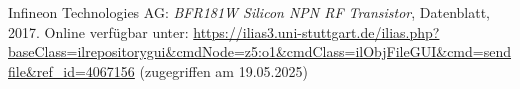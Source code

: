 
\begin{thebibliography}{1}
Infineon Technologies AG: \emph{BFR181W Silicon NPN RF Transistor}, Datenblatt, 2017. Online verfügbar unter: \url{https://ilias3.uni-stuttgart.de/ilias.php?baseClass=ilrepositorygui&cmdNode=z5:o1&cmdClass=ilObjFileGUI&cmd=sendfile&ref_id=4067156} (zugegriffen am 19.05.2025)
\end{thebibliography}
\clearpage